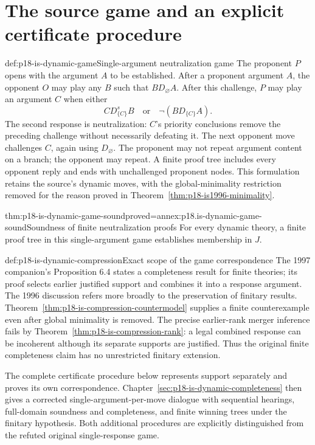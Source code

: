 \section{The source game and an explicit certificate procedure}

\begin{hbdefinition}{def:p18-is-dynamic-game}{Single-argument neutralization game}
The proponent \(P\) opens with the argument \(A\) to be established.
After a proponent argument \(A\), the opponent \(O\) may play any
\(B\) such that \(B D_\varnothing A\).
After this challenge, \(P\) may play an argument \(C\) when either
\[
 C D_{\{C\}}^s B
 \quad\text{or}\quad
 \neg(B D_{\{C\}} A).
\]
The second response is neutralization: \(C\)'s priority conclusions
remove the preceding challenge without necessarily defeating it.
The next opponent move challenges \(C\), again using
\(D_\varnothing\).
The proponent may not repeat argument content on a branch;
the opponent may repeat. A finite proof tree includes every opponent
reply and ends with unchallenged proponent nodes.
This formulation retains the source's dynamic moves, with the
global-minimality restriction removed for the reason proved in
Theorem~\ref{thm:p18-is1996-minimality}.
\end{hbdefinition}

\begin{hbtheorem}{thm:p18-is-dynamic-game-sound}{proved=annex:p18.is-dynamic-game-sound}{Soundness of finite neutralization proofs}
For every dynamic theory, a finite proof tree in this single-argument
game establishes membership in \(J\).
\end{hbtheorem}

\begin{proofboundary}{def:p18-is-dynamic-compression}{Exact scope of the game correspondence}
The 1997 companion's Proposition 6.4 states a completeness result
for finite theories; its proof selects earlier justified support and
combines it into a response argument. The 1996 discussion refers
more broadly to the preservation of finitary results.
Theorem~\ref{thm:p18-is-compression-countermodel} supplies a
finite counterexample even after global minimality is removed.
The precise earlier-rank merger inference fails by
Theorem~\ref{thm:p18-is-compression-rank}: a legal combined
response can be incoherent although its separate supports
are justified. Thus the original finite completeness claim
has no unrestricted finitary extension.

The complete certificate procedure below represents support
separately and proves its own correspondence.
Chapter~\ref{sec:p18-is-dynamic-completeness} then gives a
corrected single-argument-per-move dialogue with sequential
hearings, full-domain soundness and completeness, and finite
winning trees under the finitary hypothesis.
Both additional procedures are explicitly distinguished from
the refuted original single-response game.
\end{proofboundary}

